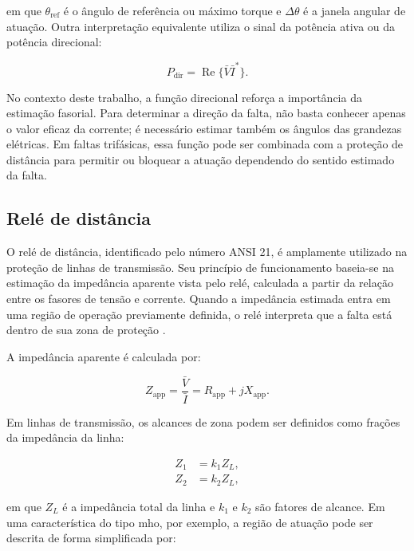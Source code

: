 \noindent em que $\theta_{\text{ref}}$ é o ângulo de referência ou máximo torque e $\Delta\theta$ é a janela angular de atuação. Outra interpretação equivalente utiliza o sinal da potência ativa ou da potência direcional:

\begin{equation}
  P_{\text{dir}} = \operatorname{Re}\{\bar{V}\bar{I}^{*}\}.
  \label{eq:potencia-direcional}
\end{equation}

No contexto deste trabalho, a função direcional reforça a importância da estimação fasorial. Para determinar a direção da falta, não basta conhecer apenas o valor eficaz da corrente; é necessário estimar também os ângulos das grandezas elétricas. Em faltas trifásicas, essa função pode ser combinada com a proteção de distância para permitir ou bloquear a atuação dependendo do sentido estimado da falta.

\subsection{Relé de distância}

O relé de distância, identificado pelo número ANSI 21, é amplamente utilizado na proteção de linhas de transmissão. Seu princípio de funcionamento baseia-se na estimação da impedância aparente vista pelo relé, calculada a partir da relação entre os fasores de tensão e corrente. Quando a impedância estimada entra em uma região de operação previamente definida, o relé interpreta que a falta está dentro de sua zona de proteção \cite{anderson1999power,horowitz2014power}.

A impedância aparente é calculada por:

\begin{equation}
  Z_{\text{app}} = \frac{\bar{V}}{\bar{I}} = R_{\text{app}} + jX_{\text{app}}.
  \label{eq:zapp}
\end{equation}

Em linhas de transmissão, os alcances de zona podem ser definidos como frações da impedância da linha:

\begin{align}
  Z_1 &= k_1 Z_L, \label{eq:zona1}\\
  Z_2 &= k_2 Z_L, \label{eq:zona2}
\end{align}

\noindent em que $Z_L$ é a impedância total da linha e $k_1$ e $k_2$ são fatores de alcance. Em uma característica do tipo mho, por exemplo, a região de atuação pode ser descrita de forma simplificada por:

